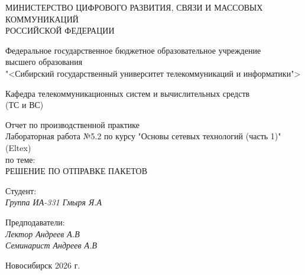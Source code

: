 \thispagestyle{empty}

\begin{center}
    МИНИСТЕРСТВО ЦИФРОВОГО РАЗВИТИЯ, СВЯЗИ И МАССОВЫХ КОММУНИКАЦИЙ \\ РОССИЙСКОЙ ФЕДЕРАЦИИ

    \vspace{20pt}

    Федеральное государственное бюджетное образовательное учреждение  \\  высшего образования \\
    "<Сибирский государственный университет телекоммуникаций и информатики"> \\

    \vspace{20pt}

    Кафедра телекоммуникационных систем и вычислительных средств \\  (ТС и ВС)
\end{center}

\vfill

\begin{center}
    Отчет по производственной практике \\    
    Лабораторная работа №5.2 по курсу "Основы сетевых технологий (часть 1)" (Eltex) \\
    \vspace{20pt}
    по теме: \\
    \uppercase{Решение по отправке пакетов}
\end{center}

\vfill

    \noindent Студент: \\
    \textit{Группа ИА-331 \hfill Гмыря Я.А}

    \vspace{20pt}

    \noindent Предподаватели: \\
    \textit{Лектор \hfill Андреев А.В} \\
    \textit{Семинарист \hfill Андреев А.В}

\vfill

\begin{center}
    Новосибирск 2026 г.
\end{center}